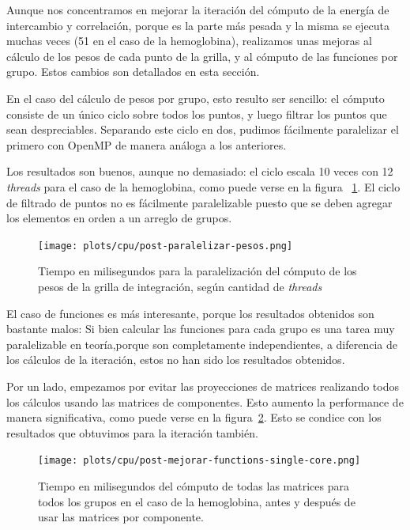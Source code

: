 Aunque nos concentramos en mejorar la iteraci\'on del c\'omputo de la energ\'ia
de intercambio y correlaci\'on, porque es la parte m\'as pesada y la misma se
ejecuta muchas veces (51 en el caso de la hemoglobina), realizamos unas mejoras
al c\'alculo de los pesos de cada punto de la grilla, y al c\'omputo de
las funciones por grupo. Estos cambios son detallados en esta secci\'on.

En el caso del c\'alculo de pesos por grupo, esto resulto ser sencillo: el
c\'omputo consiste de un \'unico ciclo sobre todos los puntos, y luego filtrar los
puntos que sean despreciables. Separando este ciclo en dos, pudimos f\'acilmente
paralelizar el primero con OpenMP de manera an\'aloga a los anteriores.

Los resultados son buenos, aunque no demasiado: el ciclo escala 10 veces con 12
\textit{threads} para el caso de la hemoglobina, como puede verse en la figura
~\ref{fig:weights-paralelizado}. El ciclo de filtrado de puntos no es f\'acilmente
paralelizable puesto que se deben agregar los elementos en orden a un arreglo
de grupos.

\begin{figure}[htbp]
   \centering
   \texttt{[image: plots/cpu/post-paralelizar-pesos.png]}
   \caption{Tiempo en milisegundos para la paralelizaci\'on del c\'omputo de los pesos
    de la grilla de integraci\'on, seg\'un cantidad de \textit{threads}}
   \label{fig:weights-paralelizado}
\end{figure}

El caso de funciones es m\'as interesante, porque los resultados obtenidos son
bastante malos: Si bien calcular las funciones para cada grupo es una tarea muy
paralelizable en teor\'ia,porque son completamente independientes, a diferencia de
los c\'alculos de la iteraci\'on, estos no han sido los resultados obtenidos.

Por un lado, empezamos por evitar las proyecciones de matrices realizando todos
los c\'alculos usando las matrices de componentes. Esto aumento la performance de
manera significativa, como puede verse en la figura~\ref{fig:lio-post-elim-proy}.
Esto se condice con los resultados que obtuvimos para la iteraci\'on tambi\'en.

\begin{figure}[htbp]
   \centering
   \texttt{[image: plots/cpu/post-mejorar-functions-single-core.png]}
   \caption{Tiempo en milisegundos del c\'omputo de todas las matrices para todos
   los grupos en el caso de la hemoglobina, antes y despu\'es de usar las matrices por
   componente.}
   \label{fig:lio-post-elim-proy}
\end{figure}

